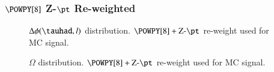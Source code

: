 \subsubsection{$\POWPY[8]$ Z-$\pt$ Re-weighted}

\begin{figure}[h!tbp]
	\centering
	\hfill
	\caption{$\Delta\phi (\tauhad,l)$ distribution. $\POWPY[8]+\text{Z-}\pt$ re-weight used for MC signal.}
	\label{AFig1P}
\end{figure} 

\begin{figure}[h!tbp]
	\centering
	\hfill
	\caption{$\Omega$ distribution. $\POWPY[8]+\text{Z-}\pt$ re-weight used for MC signal.}
	\label{AFig2P}
\end{figure} 

